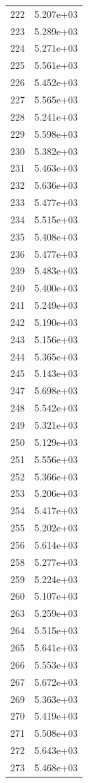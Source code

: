 \documentclass[12pt]{article}
\begin{document}
\begin{longtable}{@{}cc@{}}
222 & 5.207e+03 \\
223 & 5.289e+03 \\
224 & 5.271e+03 \\
225 & 5.561e+03 \\
226 & 5.452e+03 \\
227 & 5.565e+03 \\
228 & 5.241e+03 \\
229 & 5.598e+03 \\
230 & 5.382e+03 \\
231 & 5.463e+03 \\
232 & 5.636e+03 \\
233 & 5.477e+03 \\
234 & 5.515e+03 \\
235 & 5.408e+03 \\
236 & 5.477e+03 \\
239 & 5.483e+03 \\
240 & 5.400e+03 \\
241 & 5.249e+03 \\
242 & 5.190e+03 \\
243 & 5.156e+03 \\
244 & 5.365e+03 \\
245 & 5.143e+03 \\
247 & 5.698e+03 \\
248 & 5.542e+03 \\
249 & 5.321e+03 \\
250 & 5.129e+03 \\
251 & 5.556e+03 \\
252 & 5.366e+03 \\
253 & 5.206e+03 \\
254 & 5.417e+03 \\
255 & 5.202e+03 \\
256 & 5.614e+03 \\
258 & 5.277e+03 \\
259 & 5.224e+03 \\
260 & 5.107e+03 \\
263 & 5.259e+03 \\
264 & 5.515e+03 \\
265 & 5.641e+03 \\
266 & 5.553e+03 \\
267 & 5.672e+03 \\
269 & 5.363e+03 \\
270 & 5.419e+03 \\
271 & 5.508e+03 \\
272 & 5.643e+03 \\
273 & 5.468e+03 \\

\end{longtable}
\end{document}
